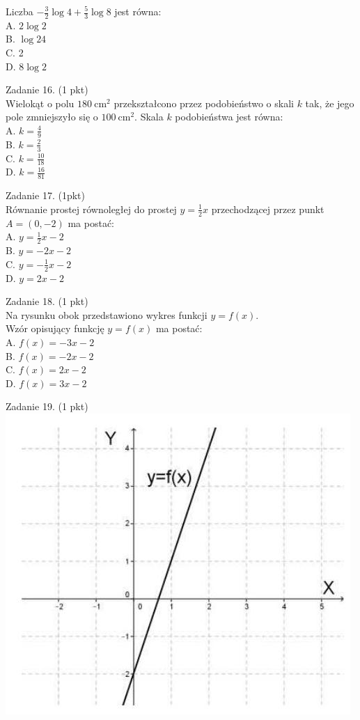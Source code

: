 \documentclass[10pt]{article}
\begin{document}
Liczba \(-\frac{3}{2} \log 4+\frac{5}{3} \log 8\) jest równa:\\
A. \(2 \log 2\)\\
B. \(\log 24\)\\
C. 2\\
D. \(8 \log 2\)

Zadanie 16. (1 pkt)\\
Wielokąt o polu \(180 \mathrm{~cm}^{2}\) przekształcono przez podobieństwo o skali \(k\) tak, że jego pole zmniejszyło się o \(100 \mathrm{~cm}^{2}\). Skala \(k\) podobieństwa jest równa:\\
A. \(k=\frac{4}{9}\)\\
B. \(k=\frac{2}{3}\)\\
C. \(k=\frac{10}{18}\)\\
D. \(k=\frac{16}{81}\)

Zadanie 17. (1pkt)\\
Równanie prostej równoległej do prostej \(y=\frac{1}{2} x\) przechodzącej przez punkt \(A=(0,-2)\) ma postać:\\
A. \(y=\frac{1}{2} x-2\)\\
B. \(y=-2 x-2\)\\
C. \(y=-\frac{1}{2} x-2\)\\
D. \(y=2 x-2\)

Zadanie 18. (1 pkt)\\
Na rysunku obok przedstawiono wykres funkcji \(y=f(x)\).\\
Wzór opisujący funkcję \(y=f(x)\) ma postać:\\
A. \(f(x)=-3 x-2\)\\
B. \(f(x)=-2 x-2\)\\
C. \(f(x)=2 x-2\)\\
D. \(f(x)=3 x-2\)

Zadanie 19. (1 pkt)\\
\includegraphics[max width=\textwidth, center]{2024_11_21_b31e6de468170710de69g-06(1)}
\end{document}

